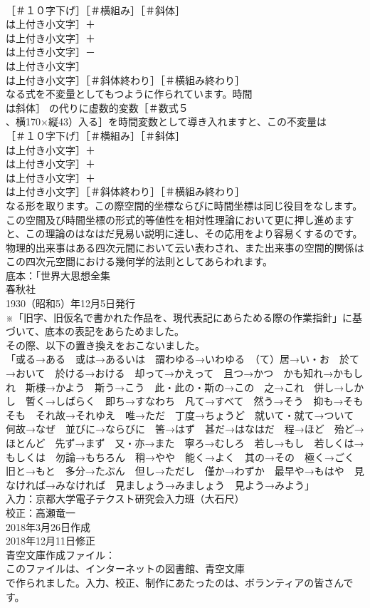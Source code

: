 \documentclass[8pt]{extreport}
\begin{document}
\begin{CJK}{UTF8}{min}
\\	［＃１０字下げ］［＃横組み］［＃斜体］
\\	は上付き小文字］＋
\\	は上付き小文字］＋
\\	は上付き小文字］－
\\	は上付き小文字］
\\	は上付き小文字］［＃斜体終わり］［＃横組み終わり］
\\	なる式を不変量としてもつように作られています。時間 
\\	は斜体］ の代りに虚数的変数［＃数式５
\\	、横170×縦43）入る］を時間変数として導き入れますと、この不変量は
\\	［＃１０字下げ］［＃横組み］［＃斜体］
\\	は上付き小文字］＋
\\	は上付き小文字］＋
\\	は上付き小文字］＋
\\	は上付き小文字］［＃斜体終わり］［＃横組み終わり］
\\	なる形を取ります。この際空間的坐標ならびに時間坐標は同じ役目をなします。この空間及び時間坐標の形式的等値性を相対性理論において更に押し進めますと、この理論のはなはだ見易い説明に達し、その応用をより容易くするのです。物理的出来事はある四次元間において云い表わされ、また出来事の空間的関係はこの四次元空間における幾何学的法則としてあらわれます。
\\	底本：「世界大思想全集　
\\	春秋社
\\	1930（昭和5）年12月5日発行
\\	※「旧字、旧仮名で書かれた作品を、現代表記にあらためる際の作業指針」に基づいて、底本の表記をあらためました。
\\	その際、以下の置き換えをおこないました。
\\	「或る→ある　或は→あるいは　謂わゆる→いわゆる　（て）居→い・お　於て→おいて　於ける→おける　却って→かえって　且つ→かつ　かも知れ→かもしれ　斯様→かよう　斯う→こう　此・此の・斯の→この　之→これ　併し→しかし　暫く→しばらく　即ち→すなわち　凡て→すべて　然う→そう　抑も→そもそも　それ故→それゆえ　唯→ただ　丁度→ちょうど　就いて・就て→ついて　何故→なぜ　並びに→ならびに　筈→はず　甚だ→はなはだ　程→ほど　殆ど→ほとんど　先ず→まず　又・亦→また　寧ろ→むしろ　若し→もし　若しくは→もしくは　勿論→もちろん　稍→やや　能く→よく　其の→その　極く→ごく　旧と→もと　多分→たぶん　但し→ただし　僅か→わずか　最早や→もはや　見なければ→みなければ　見ましょう→みましょう　見よう→みよう」
\\	入力：京都大学電子テクスト研究会入力班（大石尺）
\\	校正：高瀬竜一
\\	2018年3月26日作成
\\	2018年12月11日修正
\\	青空文庫作成ファイル：
\\	このファイルは、インターネットの図書館、青空文庫
\\	で作られました。入力、校正、制作にあたったのは、ボランティアの皆さんです。
\end{CJK}
\end{document}
